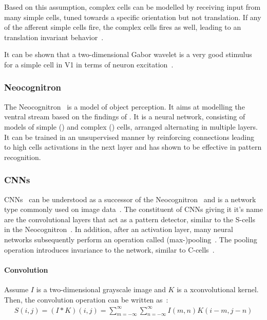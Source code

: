 Based on this assumption, complex cells can be modelled by receiving input from many simple cells, tuned towards a specific orientation but not translation.
If any of the afferent simple cells fire, the complex cells fires as well, leading to an translation invariant behavior~\citep{hubel1962receptive}.

It can be shown that a two-dimensional Gabor wavelet is a very good stimulus for a simple cell in \ac{V1} in terms of neuron excitation~\citep{jones1987evaluation}.

\subsubsection{Neocognitron}

The Neocognitron~\citep{fukushima1980neocognitron} is a model of object perception.
It aims at modelling the ventral stream based on the findings of \citet{hubel1962receptive}.
It is a neural network, consisting of models of simple () and complex () cells, arranged alternating in multiple layers.
It can be trained in an unsupervised manner by reinforcing connections leading to high cells activations in the next layer and has shown to be effective in pattern recognition.

\subsubsection{\acp{CNN}}
\acp{CNN}~\citep{lecun1989backpropagation} can be understood as a successor of the Neocognitron~\citep{lindsay2020convolutional} and is a network type commonly used on image data~\citep[p. 326]{Goodfellow-et-al-2016}.
The constituent of \acp{CNN} giving it it's name are the convolutional layers that act as a pattern detector, similar to the S-cells in the Neocognitron~\citep{lindsay2020convolutional}.
In addition, after an activation layer, many neural networks subsequently perform an operation called (max-)pooling~\citep[pp. 326, 339]{Goodfellow-et-al-2016}.
The pooling operation introduces invariance to the network, similar to C-cells~\citep{lindsay2020convolutional}.

\paragraph{Convolution}

Assume $I$ is a two-dimensional grayscale image and $K$ is a xconvolutional kernel.
Then, the convolution operation can be written as~\citep[p. 327]{Goodfellow-et-al-2016}:
\begin{align}
    S(i, j)=(I * K)(i, j)=\sum_{m=-\infty}^{\infty} \sum_{n=-\infty}^{\infty} I(m, n) K(i-m, j-n) \label{eq:conv}
\end{align}

